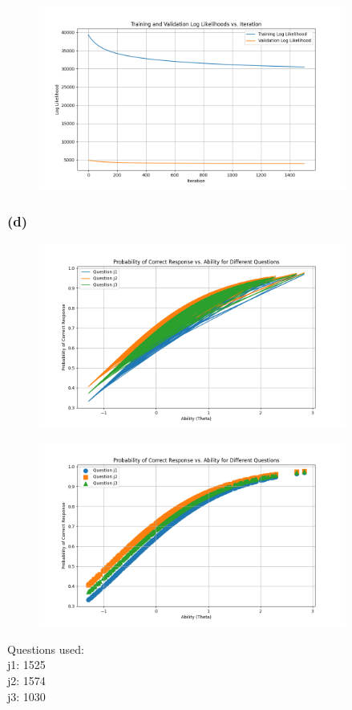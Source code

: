 \documentclass{article}
\begin{document}
\begin{figure}[H]
\centering
\includegraphics[width=0.9\textwidth]{figures/q2loglikelihood.png}
\end{figure}
\subsubsection{(d)}
\begin{figure}[H]
\centering
\includegraphics[width=0.9\textwidth]{figures/q2probability.png}\\
\end{figure}
\begin{figure}[H]
\centering
\includegraphics[width=0.9\textwidth]{figures/q2probability2.png}\\
\end{figure}
Questions used:\\
j1: 1525\\
j2: 1574\\
j3: 1030\\
\end{document}
